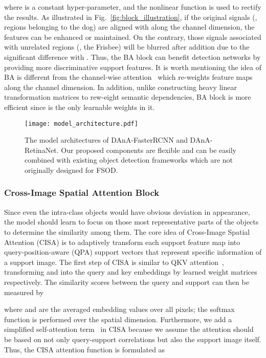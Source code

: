 \documentclass[journal]{IEEEtran}
\begin{document}
where  is a constant hyper-parameter, and the nonlinear function is used to rectify the results.
As illustrated in Fig.~\ref{fig:block_illustration}, if the original signals (, regions belonging to the dog) are aligned with  along the channel dimension, the features can be enhanced or maintained.
On the contrary, those signals associated with unrelated regions (, the Frisbee) will be blurred after addition due to the significant difference with .
Thus, the BA block can benefit detection networks by providing more discriminative support features.
It is worth mentioning the idea of BA is different from the channel-wise attention~\cite{hu2018squeeze, fu2019dual} which re-weights feature maps along the channel dimension.
In addition, unlike \cite{cao2019gcnet} constructing heavy linear transformation matrices to rew-eight semantic dependencies, BA block is more efficient since  is the only learnable weights in it. 



\begin{figure}[t]
    \centering
    \texttt{[image: model\_architecture.pdf]}
    \caption{The model architectures of DAnA-FasterRCNN and DAnA-RetinaNet. Our proposed components are flexible and can be easily combined with existing object detection frameworks which are not originally designed for FSOD.
    }
    \label{fig:architecture}
\end{figure}


\subsubsection{Cross-Image Spatial Attention Block}
\label{section:method_cisa}
Since even the intra-class objects would have obvious deviation in appearance, the model should learn to focus on those most representative parts of the objects to determine the similarity among them.
The core idea of Cross-Image Spatial Attention (CISA) is to adaptively transform each support feature map into query-position-aware (QPA) support vectors that represent specific information of a support image.
The first step of CISA is similar to QKV attention~\cite{vaswani2017attention}, transforming  and  into the query and key embeddings  by learned weight matrices  respectively.
The similarity scores between the query and support can then be measured by

where  and  are the averaged embedding values over all pixels; the softmax function  is performed over the spatial dimension.
Furthermore, we add a simplified self-attention term~\cite{cao2019gcnet} in CISA because we assume the attention should be based on not only query-support correlations but also the support image itself.
Thus, the CISA attention function is formulated as
\end{document}
